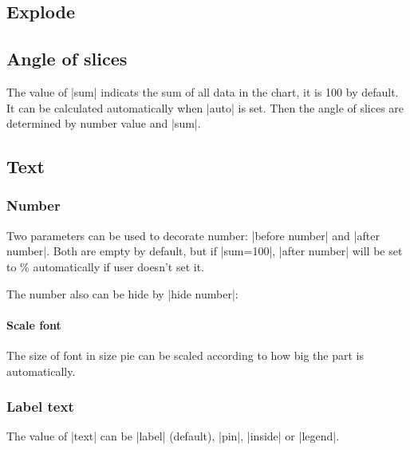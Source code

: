 \documentclass{ltxdoc}
\begin{document}
\codeexample[scale=0.4,from file={demo/color.tex}]

\subsection{Explode}
\codeexample[scale=0.4,from file={demo/explode.tex}]

\subsection{Angle of slices}
The value of |sum| indicats the sum of all data in the chart,
it is 100 by default. It can be calculated automatically when
|auto| is set. Then the angle of slices are determined by
number value and |sum|.

\codeexample[scale=0.4,from file={demo/sum.tex}]

\subsection{Text}

\subsubsection{Number}
Two parameters can be used to decorate number: |before number|
and |after number|. Both are empty by default, but if
|sum=100|, |after number| will be set to \%
automatically if user doesn't set it.

\codeexample[scale=0.25,from file={demo/before-after-number.tex}]

The number also can be hide by |hide number|:

\codeexample[scale=0.25,from file={demo/hide-number.tex}]

\paragraph{Scale font}
The size of font in size pie can be scaled according to how big the
part is automatically.

\codeexample[scale=0.25,from file={demo/scalefont.tex}]

\subsubsection{Label text}
The value of |text| can be |label| (default),
|pin|, |inside| or |legend|.

\codeexample[scale=0.25,from file={demo/text.tex}]
\end{document}
